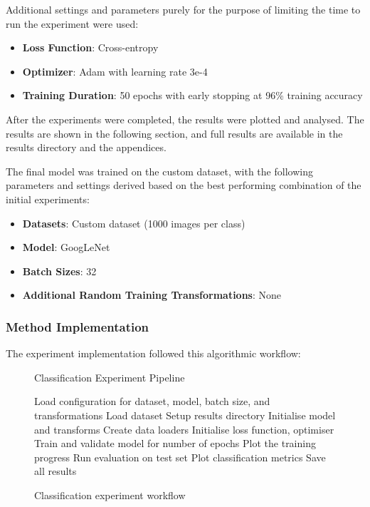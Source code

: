 \documentclass[conference]{IEEEtran}
\begin{document}
Additional settings and parameters purely for the purpose of limiting the time to run the experiment were used:

\begin{itemize}
    \item \textbf{Loss Function}: Cross-entropy
    \item \textbf{Optimizer}: Adam with learning rate 3e-4
    \item \textbf{Training Duration}: 50 epochs with early stopping at 96\% training accuracy 
\end{itemize}

After the experiments were completed, the results were plotted and analysed. The results are shown in the following section, and full results are available in the results directory
and the appendices.

The final model was trained on the custom dataset, with the following parameters and settings derived based on the best performing combination of the initial experiments:

\begin{itemize}
  \item \textbf{Datasets}: Custom dataset (1000 images per class)
  \item \textbf{Model}: GoogLeNet
  \item \textbf{Batch Sizes}: 32
  \item \textbf{Additional Random Training Transformations}: None
\end{itemize}

\subsubsection{Method Implementation}

The experiment implementation followed this algorithmic workflow:

\begin{figure}[H]
\begin{algorithm}[H]
\caption{Classification Experiment Pipeline}
\begin{algorithmic}[1]
\STATE Load configuration for dataset, model, batch size, and transformations
    \STATE Load dataset
    \STATE Setup results directory
    \STATE Initialise model and transforms
    \STATE Create data loaders
    \STATE Initialise loss function, optimiser
    \STATE Train and validate model for number of epochs
    \STATE Plot the training progress
    \STATE Run evaluation on test set
    \STATE Plot classification metrics
    \STATE Save all results
\ENDFOR
\end{algorithmic}
\end{algorithm}
\caption{Classification experiment workflow}
\end{figure}
\end{document}
